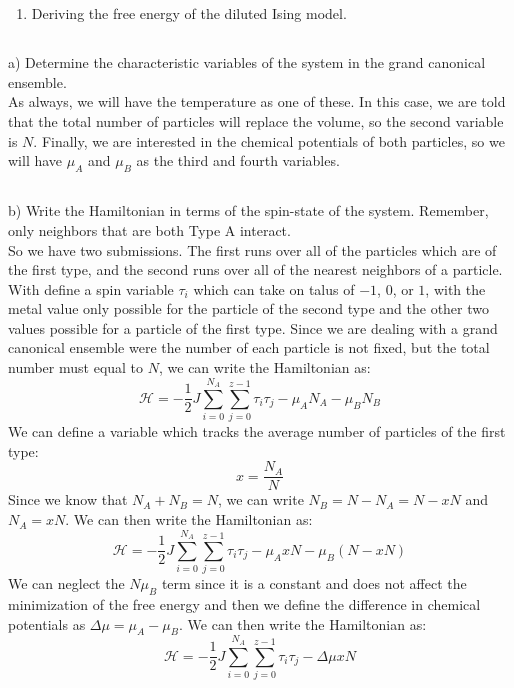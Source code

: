 \documentclass[12pt]{article}
\begin{document}
\section{}
\begin{enumerate}
  \item Deriving the free energy of the diluted Ising model.
\end{enumerate}
\subsection{}
a) Determine the characteristic variables of the system in the grand canonical ensemble.\\
As always, we will have the temperature as one of these. In this case, we are told that the total number of particles will replace the volume, so the second variable is $N$. Finally, we are interested in the chemical potentials of both particles, so we will have $\mu_{A}$ and $\mu_{B}$ as the third and fourth variables.
\subsection{}
b) Write the Hamiltonian in terms of the spin-state of the system. Remember, only neighbors that are both Type A interact.\\
So we have two submissions. The first runs over all of the particles which are of the first type, and the second runs over all of the nearest neighbors of a particle. With define a spin variable $\tau_{i}$ which can take on talus of $-1$, $0$, or $1$, with the metal value only possible for the particle of the second type and the other two values possible for a particle of the first type. Since we are dealing with a grand canonical ensemble were the number of each particle is not fixed, but the total number must equal to $N$, we can write the Hamiltonian as:
\begin{equation}
  \mathcal{H}=-\frac{1}{2}J \sum_{i=0}^{N_{A}} \sum_{j=0}^{z-1} \tau_{i} \tau_{j} - \mu_{A} N_{A} - \mu_{B} N_{B}
\end{equation}
We can define a variable which tracks the average number of particles of the first type:
\begin{equation}
  x = \frac{N_{A}}{N}
\end{equation}
Since we know that $N_{A} + N_{B} = N$, we can write $N_{B} = N - N_{A} = N - xN$ and $N_{A} = xN$. We can then write the Hamiltonian as:
\begin{equation}
  \mathcal{H}=-\frac{1}{2}J \sum_{i=0}^{N_{A}} \sum_{j=0}^{z-1} \tau_{i} \tau_{j} - \mu_{A} xN - \mu_{B} (N - xN)
\end{equation}
We can neglect the $N\mu_{B}$ term since it is a constant and does not affect the minimization of the free energy and then we define the difference in chemical potentials as $\Delta \mu = \mu_{A} - \mu_{B}$. We can then write the Hamiltonian as:
\begin{equation}
  \mathcal{H}=-\frac{1}{2}J \sum_{i=0}^{N_{A}} \sum_{j=0}^{z-1} \tau_{i} \tau_{j} - \Delta \mu xN
\end{equation}
\end{document}
